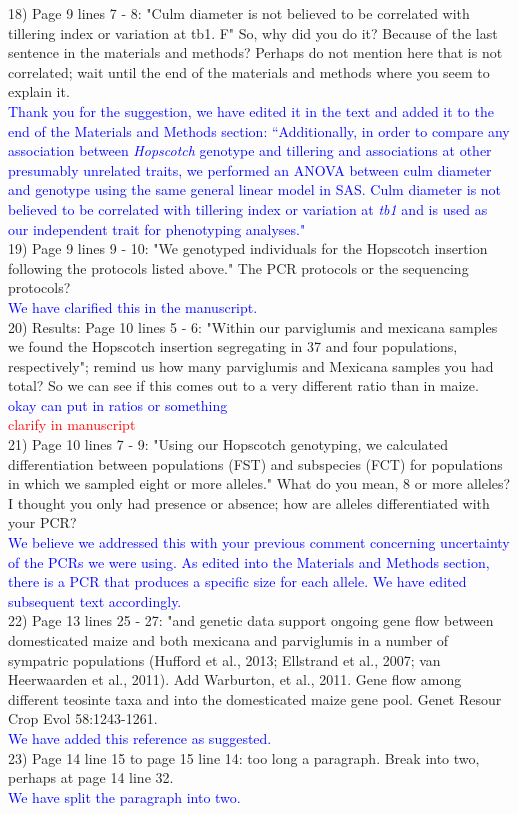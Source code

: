 \documentclass[11pt]{article}
\newcommand{\res}[1]{\noindent \textcolor{blue}{{#1}} \\}
\newcommand{\jri}[1]{\noindent \textcolor{red}{{#1}} \\}
\begin{document}
18) Page 9 lines 7 - 8: "Culm diameter is not believed to be correlated with tillering index or variation at tb1. F" So, why did you do it? Because of the last sentence in the materials and methods? Perhaps do not mention here that is not correlated; wait until the end of the materials and methods where you seem to explain it.\\ 

\res{Thank you for the suggestion, we have edited it in the text and added it to the end of the Materials and Methods section: ``Additionally, in order to compare any association between \emph{Hopscotch} genotype and tillering and associations at other presumably unrelated traits, we performed an ANOVA between culm diameter and genotype using the same general linear model in SAS. Culm diameter is not believed to be correlated with tillering index or variation at \emph{tb1} and is used as our independent trait for phenotyping analyses."}

19) Page 9 lines 9 - 10: "We genotyped individuals for the Hopscotch insertion following the protocols listed above." The PCR protocols or the sequencing protocols?\\ 

\res{We have clarified this in the manuscript.}

20) Results:
Page 10 lines 5 - 6: "Within our parviglumis and mexicana samples we found the Hopscotch insertion segregating in 37 and four populations, respectively"; remind us how many parviglumis and Mexicana samples you had total? So we can see if this comes out to a very different ratio than in maize.\\ 

\res{okay can put in ratios or something}
\jri{clarify in manuscript}

21) Page 10 lines 7 - 9: "Using our Hopscotch genotyping, we calculated diﬀerentiation between populations (FST) and subspecies (FCT) for populations in which we sampled eight or more alleles." What do you mean, 8 or more alleles? I thought you only had presence or absence; how are alleles differentiated with your PCR?\\ 

\res{We believe we addressed this with your previous comment concerning uncertainty of the PCRs we were using. As edited into the Materials and Methods section, there is a PCR that produces a specific size for each allele. We have edited subsequent text accordingly.}

22) Page 13 lines 25 - 27: "and genetic data support ongoing gene ﬂow between domesticated maize and both mexicana and parviglumis in a number of sympatric populations (Huﬀord et al., 2013; Ellstrand et al., 2007; van Heerwaarden et al., 2011). Add Warburton, et al., 2011.  Gene flow among different teosinte taxa and into the domesticated maize gene pool.  Genet Resour Crop Evol 58:1243-1261.\\ 

\res{We have added this reference as suggested.}

23) Page 14 line 15 to page 15 line 14: too long a paragraph. Break into two, perhaps at page 14 line 32.\\ 

\res{We have split the paragraph into two.}
\end{document}
